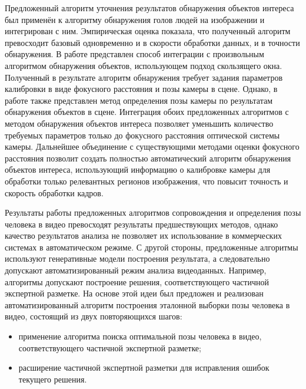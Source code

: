{\influence} Предложенный алгоритм уточнения результатов обнаружения объектов интереса был применён к алгоритму обнаружения голов людей на изображении и интегрирован с ним. Эмпирическая оценка показала, что полученный алгоритм превосходит базовый одновременно и в скорости обработки данных, и в точности обнаружения. В работе представлен способ интеграции с произвольным алгоритмом обнаружения объектов, использующем подход скользящего окна. Полученный в результате алгоритм обнаружения требует задания параметров калибровки в виде фокусного расстояния и позы камеры в сцене. Однако, в работе также представлен метод определения позы камеры по результатам обнаружения объектов в сцене. Интеграция обоих предложенных алгоритмов с методом обнаружения объектов интереса позволяет уменьшить количество требуемых параметров только до фокусного расстояния оптической системы камеры. Дальнейшее объединение с существующими методами оценки фокусного расстояния позволит создать полностью автоматический алгоритм обнаружения объектов интереса, использующий информацию о калибровке камеры для обработки только релевантных регионов изображения, что повысит точность и скорость обработки кадров.

Результаты работы предложенных алгоритмов сопровождения и определения позы человека в видео превосходят результаты предшествующих методов, однако качество результатов анализа не позволяет их использование в коммерческих системах в автоматическом режиме. С другой стороны, предложенные алгоритмы используют генеративные модели построения результата, а следовательно допускают автоматизированный режим анализа видеоданных. Например, алгоритмы допускают построение решения, соответствующего частичной экспертной разметке. На основе этой идеи был предложен и реализован автоматизированный алгоритм построения эталонной выборки позы человека в видео, состоящий из двух повторяющихся шагов:
\begin{itemize}
	\item применение алгоритма поиска оптимальной позы человека в видео, соответствующего частичной экспертной разметке;
	\item расширение частичной экспертной разметки для исправления ошибок текущего решения.
\end{itemize}




